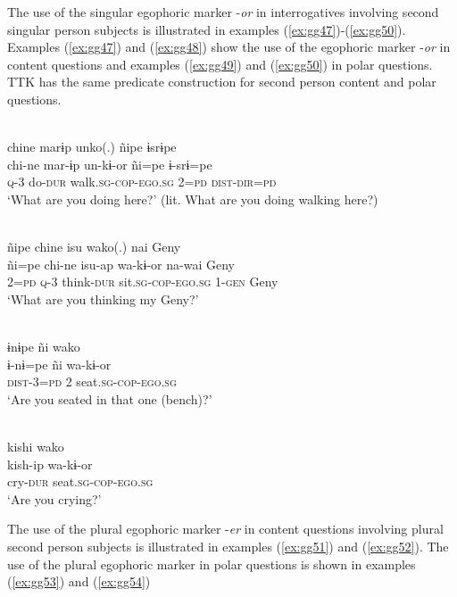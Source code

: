 \documentclass[output=paper]{langsci/langscibook}
\begin{document}
The use of the singular egophoric marker -\textit{or} in interrogatives involving second singular person subjects is illustrated in examples (\ref{ex:gg47})-(\ref{ex:gg50}).
Examples (\ref{ex:gg47}) and (\ref{ex:gg48}) show the use of the egophoric marker -\textit{or} in content questions and examples (\ref{ex:gg49}) and (\ref{ex:gg50}) in polar questions. TTK has the same predicate construction for second person content and polar questions.



\ea \label{ex:gg47}
\\
    \glll chine	marɨp	unko(.)	ñipe	ɨsrɨpe\\
    chi-ne	mar-ɨp	un-kɨ-or	ñi=pe	ɨ-srɨ=pe\\
         \textsc{q}-3	do-\textsc{dur}	walk.\textsc{sg}-\textsc{cop-ego.sg} 2=\textsc{pd}	\textsc{dist-dir=pd}\\
    \glt ‘What are you doing here?' (lit. What are you doing walking here?)
\z

\ea \label{ex:gg48}
\\
    \glll ñipe	chine	isu	wako(.)	nai 	Geny\\
    ñi=pe	chi-ne	isu-ap	wa-kɨ-or na-wai	Geny\\
	2=\textsc{pd} \textsc{q-3} think-\textsc{dur} sit.\textsc{sg-cop-ego.sg} \textsc{1-gen} Geny\\
	\glt ‘What are you thinking my Geny?’ 
\z


\ea \label{ex:gg49}
\\
    \glll ɨnɨpe	ñi	wako\\
    ɨ-nɨ=pe	ñi	wa-kɨ-or\\
	\textsc{dist}-3=\textsc{pd}	2	seat.\textsc{sg-cop-ego.sg}\\
	\glt ‘Are you seated in that one (bench)?’
\z

\ea \label{ex:gg50}
\\
    \glll kishi	wako\\
    kish-ip	 wa-kɨ-or\\
	cry-\textsc{dur} seat.\textsc{sg-cop-ego.sg}\\
	\glt ‘Are you crying?’ 
\z

The use of the plural egophoric marker -\textit{er} in content questions involving plural second person subjects is illustrated in examples (\ref{ex:gg51}) and (\ref{ex:gg52}). The use of the plural egophoric marker in polar questions is shown in examples (\ref{ex:gg53}) and (\ref{ex:gg54})
\end{document}
